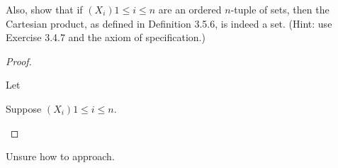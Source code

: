 \documentclass[../../main.tex]{subfiles}
\begin{document}
\begin{q}
    Also, show that if $(X_i){1 \leq i \leq n}$ are an ordered $n$-tuple of sets, then the Cartesian product, as defined in Definition 3.5.6, is indeed a set. (Hint: use Exercise 3.4.7 and the axiom of specification.)
\end{q}

\begin{proof}
\begin{lxl}
    \item Let 
    \item Suppose $(X_i){1 \leq i \leq n}$.
    \begin{lxl}
        \item
    \end{lxl}
\end{lxl}
\end{proof}
\begin{xx}
    Unsure how to approach.
\end{xx}

\addtocounter{subsection}{1}
\end{document}
